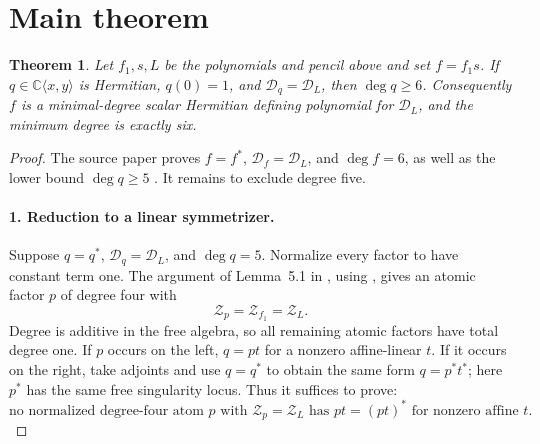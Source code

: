 \documentclass[11pt]{article}
\newtheorem{theorem}{Theorem}
\newcommand{\C}{\mathbb C}
\newcommand{\D}{\mathcal D}
\newcommand{\Z}{\mathcal Z}
\begin{document}
\section{Main theorem}

\begin{theorem}\label{thm:main}
Let $f_1,s,L$ be the polynomials and pencil above and set $f=f_1s$.  If $q\in\C\langle x,y\rangle$ is Hermitian, $q(0)=1$, and $\D_q=\D_L$, then $\deg q\ge 6$.  Consequently $f$ is a minimal-degree scalar Hermitian defining polynomial for $\D_L$, and the minimum degree is exactly six.
\end{theorem}

\begin{proof}
The source paper proves $f=f^*$, $\D_f=\D_L$, and $\deg f=6$, as well as the lower bound $\deg q\ge5$ \cite[Lemma~5.1 and Section~5.2]{HKMV}.  It remains to exclude degree five.

\paragraph{1. Reduction to a linear symmetrizer.}
Suppose $q=q^*$, $\D_q=\D_L$, and $\deg q=5$.  Normalize every factor to have constant term one.  The argument of Lemma~5.1 in \cite{HKMV}, using \cite[Theorem~4.3(3)]{HKV}, gives an atomic factor $p$ of degree four with
\[
\Z_p=\Z_{f_1}=\Z_L.
\]
Degree is additive in the free algebra, so all remaining atomic factors have total degree one.  If $p$ occurs on the left, $q=pt$ for a nonzero affine-linear $t$.  If it occurs on the right, take adjoints and use $q=q^*$ to obtain the same form $q=p^*t^*$; here $p^*$ has the same free singularity locus.  Thus it suffices to prove:
\begin{equation}\label{eq:goal}
\text{no normalized degree-four atom $p$ with $\Z_p=\Z_L$ has $pt=(pt)^*$ for nonzero affine $t$.}
\end{equation}


\end{proof}
\end{document}
